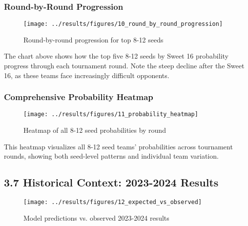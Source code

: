 \documentclass[
]{article}
\begin{document}
\subsubsection{Round-by-Round
Progression}\label{round-by-round-progression}

\begin{figure}

{\centering \texttt{[image: ../results/figures/10\_round\_by\_round\_progression]} 

}

\caption{Round-by-round progression for top 8-12 seeds}\label{fig:progression-plot}
\end{figure}

The chart above shows how the top five 8-12 seeds by Sweet 16
probability progress through each tournament round. Note the steep
decline after the Sweet 16, as these teams face increasingly difficult
opponents.

\subsubsection{Comprehensive Probability
Heatmap}\label{comprehensive-probability-heatmap}

\begin{figure}

{\centering \texttt{[image: ../results/figures/11\_probability\_heatmap]} 

}

\caption{Heatmap of all 8-12 seed probabilities by round}\label{fig:probability-heatmap}
\end{figure}

This heatmap visualizes all 8-12 seed teams' probabilities across
tournament rounds, showing both seed-level patterns and individual team
variation.

\subsection{3.7 Historical Context: 2023-2024
Results}\label{historical-context-2023-2024-results}

\begin{figure}

{\centering \texttt{[image: ../results/figures/12\_expected\_vs\_observed]} 

}

\caption{Model predictions vs. observed 2023-2024 results}\label{fig:historical-context-plot}
\end{figure}
\end{document}
